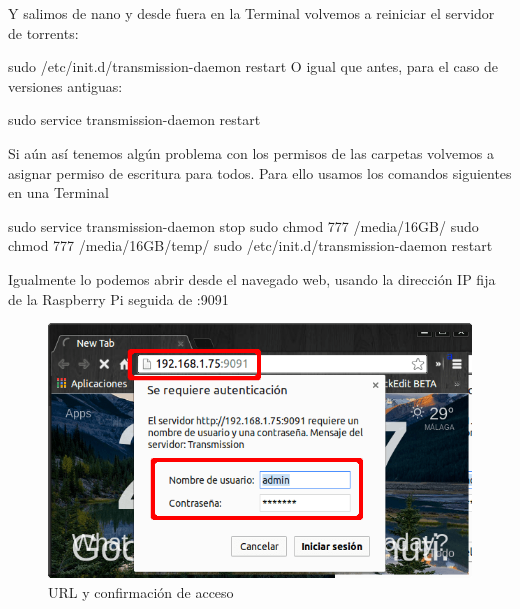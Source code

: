 \documentclass{article}
\begin{document}
Y salimos de nano y desde fuera en la Terminal volvemos a reiniciar el servidor de torrents:

sudo /etc/init.d/transmission-daemon restart
O igual que antes, para el caso de versiones antiguas:

sudo service transmission-daemon restart

Si aún así tenemos algún problema con los permisos de las carpetas volvemos a asignar permiso de escritura para todos. Para ello usamos los comandos siguientes en una Terminal

sudo service transmission-daemon stop
sudo chmod 777 /media/16GB/
sudo chmod 777 /media/16GB/temp/
sudo /etc/init.d/transmission-daemon restart

Igualmente lo podemos abrir desde el navegado web, usando la dirección IP fija de la Raspberry Pi seguida de :9091

\begin{figure}[h!]
\centering
\includegraphics[scale=0.5]{torrent19.png}
\caption{URL y confirmación de acceso}
\label{fig:torrent1}
\end{figure}
\end{document}

